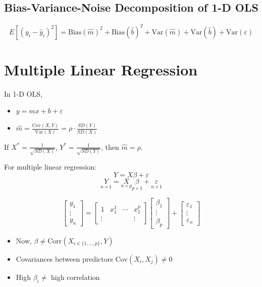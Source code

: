 \documentclass{article}
\begin{document}
\subsection*{Bias-Variance-Noise Decomposition of 1-D OLS}

\[
E[(y_i - \hat{y}_i)^2] = \text{Bias}(\hat{m})^2 + \text{Bias}(\hat{b})^2 + \text{Var}(\hat{m}) + \text{Var}(\hat{b}) + \text{Var}(\varepsilon)
\]

\section*{Multiple Linear Regression}

In 1-D OLS,
\begin{itemize}
    \item $y = mx + b + \varepsilon$
    \item $\hat{m} = \frac{\text{Cov}(X, Y)}{\text{Var}(X)} = \rho \cdot \frac{SD(Y)}{SD(X)}$
\end{itemize}

If $X^* = \frac{1}{\sqrt{SD(X)}}$, $Y^* = \frac{1}{\sqrt{SD(Y)}}$, then $\hat{m} = \rho$.

For multiple linear regression:
\[
Y = X\beta + \varepsilon
\]
\[
\underset{n \times 1}{Y} = \underset{n \times p}{X} \underset{p \times 1}{\beta} + \underset{n \times 1}{\varepsilon}
\]

\[
\begin{bmatrix} y_1 \\ \vdots \\ y_n \end{bmatrix} = \begin{bmatrix} 1 & x_1^1 & \cdots & x_1^p \\ \vdots & & & \vdots \end{bmatrix} \begin{bmatrix} \beta_1 \\ \vdots \\ \beta_p \end{bmatrix} + \begin{bmatrix} \varepsilon_1 \\ \vdots \\ \varepsilon_n \end{bmatrix}
\]

\begin{itemize}
    \item Now, $\beta \neq \text{Corr}(X_{i \in \{1, \ldots, p\}}, Y)$
    \item Covariances between predictors $\text{Cov}(X_i, X_j) \neq 0$
    \item High $\beta_i \neq$ high correlation
\end{itemize}
\end{document}
